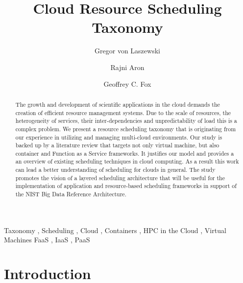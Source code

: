 \documentclass[final,5p,times,twocolumn]{elsarticle}
\begin{document}
\begin{frontmatter}

\title{Cloud Resource Scheduling Taxonomy}

\author[iu]{Gregor von Laszewski}
\address[iu]{{\small $^1$ Intelligent Systems Engineering Dep., Indiana University, Bloomington, IN 47408, USA.}}

\author[punjab]{Rajni Aron}
\address[punjab]{School of Computer Science and Engineering, Lovely Professional University, Punjab, India}


\author[iu]{Geoffrey C. Fox}


\begin{abstract}
The growth and development of scientific applications in the cloud
demands the creation of efficient resource management systems. Due to
the scale of resources, the heterogeneity of services, their
inter-dependencies and unpredictability of load this is a complex
problem. We present a resource scheduling taxonomy that is originating
from our experience in utilizing and managing multi-cloud environments. 
Our study is backed up by a literature review that
targets not only virtual machine, but also container and Function as a
Service frameworks. It justifies our model and provides a an overview
of existing scheduling techniques in cloud computing. As a result this
work can lead a better understanding of scheduling for clouds
in general. The study promotes the vision of a layered scheduling
architecture that will be useful for the implementation of application
and resource-based scheduling frameworks in support of the NIST Big
Data Reference Architecture.

\end{abstract}

\begin{keyword}
  Taxonomy \sep
  Scheduling \sep
  Cloud \sep
  Containers \sep
  HPC in the Cloud \sep
  Virtual Machines
  FaaS \sep
  IaaS \sep
  PaaS
\end{keyword}

\end{frontmatter}

\section{Introduction}
\end{document}
